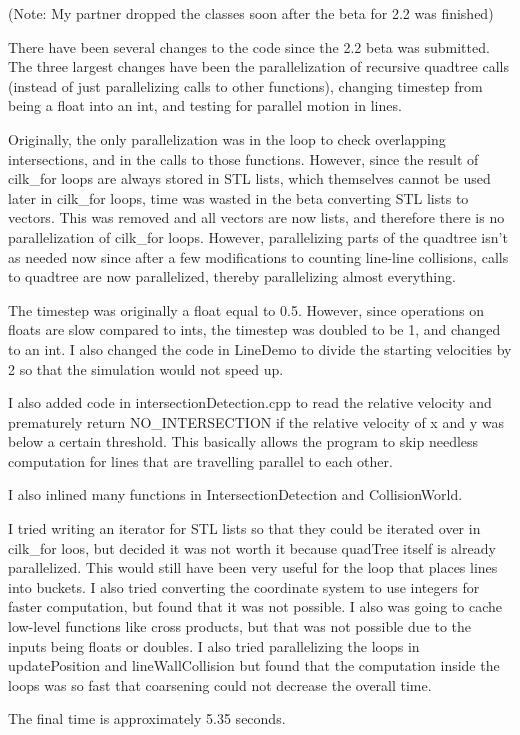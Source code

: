 \documentclass[12pt]{article}
\begin{document}
\maketitle

(Note: My partner dropped the classes soon after the beta for 2.2 was finished)

There have been several changes to the code since the 2.2 beta was submitted.  
The three largest changes have been the parallelization of recursive quadtree 
calls (instead of just parallelizing calls to other functions), changing 
timestep from being a float into an int, and testing for parallel motion in lines.  

Originally, the only parallelization was in the loop to check overlapping intersections, and 
in the calls to those functions.  However, since the result of cilk\_for loops are 
always stored in STL lists, which themselves cannot be used later in cilk\_for loops, 
time was wasted in the beta converting STL lists to vectors.  This was removed and 
all vectors are now lists, and therefore there is no parallelization of cilk\_for loops.  
However, parallelizing parts of the quadtree isn't as needed now since after a few 
modifications to counting line-line collisions, calls to quadtree are now parallelized, 
thereby parallelizing almost everything.  

The timestep was originally a float equal to 0.5.  However, since operations on floats are 
slow compared to ints, the timestep was doubled to be 1, and changed to an int.  
I also changed the code in LineDemo to divide the starting velocities by 2 so that 
the simulation would not speed up.  

I also added code in intersectionDetection.cpp to read the relative velocity and 
prematurely return NO\_INTERSECTION if the relative velocity of x and y was below 
a certain threshold.  This basically allows the program to skip needless computation 
for lines that are travelling parallel to each other.  

I also inlined many functions in IntersectionDetection and CollisionWorld.  

I tried writing an iterator for STL lists so that they could be iterated over in 
cilk\_for loos, but decided it was not worth it because quadTree itself is already 
parallelized.  This would still have been very useful for the loop that places 
lines into buckets.  I also tried converting the coordinate system to use integers for 
faster computation, but found that it was not possible.  I also was going to 
cache low-level functions like cross products, but that was not possible due to 
the inputs being floats or doubles.  I also tried parallelizing the loops in 
updatePosition and lineWallCollision but found that the computation inside the 
loops was so fast that coarsening could not decrease the overall time.  

The final time is approximately 5.35 seconds.  
\end{document}
